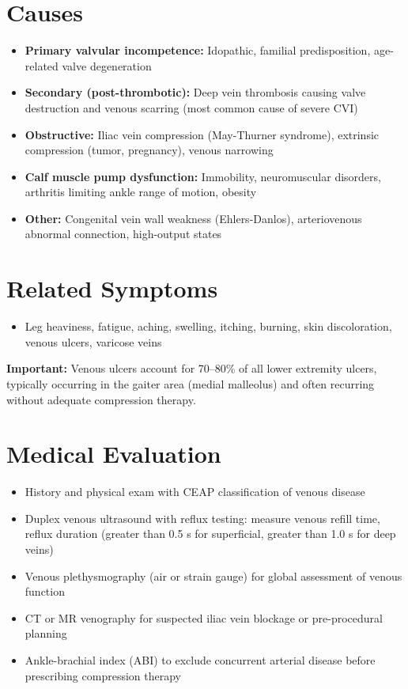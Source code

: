 \section*{Causes}
\begin{itemize}
  \item \textbf{Primary valvular incompetence:} Idopathic, familial predisposition, age-related valve degeneration
  \item \textbf{Secondary (post-thrombotic):} Deep vein thrombosis causing valve destruction and venous scarring (most common cause of severe CVI)
  \item \textbf{Obstructive:} Iliac vein compression (May-Thurner syndrome), extrinsic compression (tumor, pregnancy), venous narrowing
  \item \textbf{Calf muscle pump dysfunction:} Immobility, neuromuscular disorders, arthritis limiting ankle range of motion, obesity
  \item \textbf{Other:} Congenital vein wall weakness (Ehlers-Danlos), arteriovenous abnormal connection, high-output states
\end{itemize}

\section*{Related Symptoms}
\begin{itemize}
  \item Leg heaviness, fatigue, aching, swelling, itching, burning, skin discoloration, venous ulcers, varicose veins
\end{itemize}
\textbf{Important:} Venous ulcers account for 70--80\% of all lower extremity ulcers, typically occurring in the gaiter area (medial malleolus) and often recurring without adequate compression therapy.

\section*{Medical Evaluation}
\begin{itemize}
  \item History and physical exam with CEAP classification of venous disease
  \item Duplex venous ultrasound with reflux testing: measure venous refill time, reflux duration (greater than 0.5 s for superficial, greater than 1.0 s for deep veins)
  \item Venous plethysmography (air or strain gauge) for global assessment of venous function
  \item CT or MR venography for suspected iliac vein blockage or pre-procedural planning
  \item Ankle-brachial index (ABI) to exclude concurrent arterial disease before prescribing compression therapy
\end{itemize}

